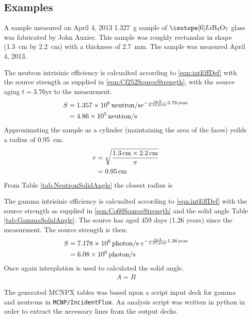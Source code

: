 \documentclass[draftcls,onecolumn]{IEEEtran}
\begin{document}
\pagebreak
\subsection{Examples}
\begin{Exercise*}[label={LiBorateGlass},title={Li borate glass},name={Example}]
A sample measured on April 4, 2013 \SI{1.327}{\g} sample of $\iso[6]{Li}\text{B}_4\text{O}_7$ glass was fabricated by John Auxier.
This sample was roughly rectanular in shape (\SI{1.3}{\cm} by \SI{2.2}{\cm}) with a thickness of \SI{2.7}{\mm}.
The sample was measured April 4, 2013.



The neutron intrisinic efficiency is calcualted according to \eqref{eqn:intEffDef} with the source strength as supplied in \eqref{eqn:Cf252SourceStrength}, with the source aging $t = 3.76 \text{yr}$ to the measurment.
\begin{align}
    S &= \SI{1.357E6}{neutron\per\second} e^{-\frac{ \ln{2}}{\SI{2.54}{year}}\SI{3.76}{year}} \\ \notag
      &= \SI{4.86E5}{neutron\per\second}
\end{align}
Approximating the sample as a cylinder (maintaining the area of the faces) yeilds a radius of \SI{0.95}{\cm}.
\begin{align}
	r &= \sqrt{\frac{\SI{1.3}{\cm} \times \SI{2.2}{\cm}}{\pi}} \\ \notag
	& = \SI{0.95}{\cm}
\end{align}
From Table \ref{tab:NeutronSolidAngle} the closest radius is


The gamma intrisinic efficiency is calcualted according to \eqref{eqn:intEffDef} with the source strength as supplied in \eqref{eqn:Co60SourceStrength} and the solid angle Table \ref{tab:GammaSolidAngle}.
The  source has aged 459 days (1.26 years) since the measurment.
The source strength is then:
\begin{align}
  S &= \SI{7.178E6}{photon\per\second}\;e^{-\frac{ \ln{2}}{\SI{5.27}{year}}\SI{1.26}{year}} \\ \notag
    &= \SI{6.08E6}{photon\per\second}
\end{align}
Once again interplation is used to calculated the solid angle.
\begin{align}
A = B
\end{align}
\end{Exercise*}



\Appendix
The generated MCNPX tables was based upon a script input deck for gamma and neutrons in \verb+MCNP/IncidentFlux+.
An analysis script was written in python in order to extract the necessary lines from the output decks.
\end{document}
